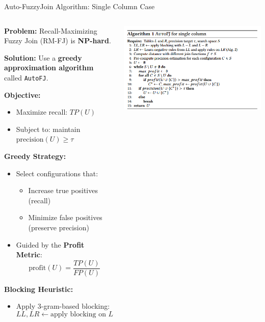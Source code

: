 \documentclass[8pt]{beamer} %
\begin{document}
\begin{frame}{Auto-FuzzyJoin Algorithm: Single Column Case}
	\begin{columns}
		\begin{column}{0.55\textwidth}
			\textbf{Problem:} Recall-Maximizing Fuzzy Join (RM-FJ) is \textbf{NP-hard}.
			
			\vspace{0.5em}
			\textbf{Solution:} Use a \textbf{greedy approximation algorithm} called \texttt{AutoFJ}.
			
			\vspace{0.5em}
			\textbf{Objective:}
			\begin{itemize}
				\item Maximize recall: $TP(U)$
				\item Subject to: maintain $\text{precision}(U) \geq \tau$
			\end{itemize}
			
			\textbf{Greedy Strategy:}
			\begin{itemize}
				\item Select configurations that:
				\begin{itemize}
					\item Increase true positives (recall)
					\item Minimize false positives (preserve precision)
				\end{itemize}
				\item Guided by the \textbf{Profit Metric}:
				$$
				\text{profit}(U) = \frac{TP(U)}{FP(U)}
				$$
			\end{itemize}
			
			\textbf{Blocking Heuristic:}
			\begin{itemize}
				\item Apply 3-gram-based blocking:
				$$
				LL, LR \leftarrow \text{apply blocking on } L{-}L, L{-}R
				$$
			\end{itemize}
		\end{column}
		
		\begin{column}{0.45\textwidth}
			\centering
			\includegraphics[width=\linewidth]{img/autofj-algorithm.png}
		\end{column}
	\end{columns}
\end{frame}
\end{document}
